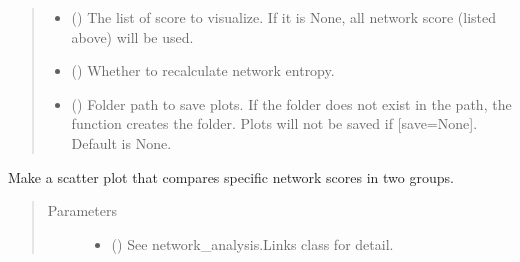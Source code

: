 \documentclass[letterpaper,10pt,english]{sphinxmanual}
\begin{document}
\begin{fulllineitems}
\begin{fulllineitems}
\begin{quote}
\begin{description}
\begin{itemize}
\item {} 
 () \textendash{} The list of score to visualize. If it is None, all network score (listed above) will be used.

\item {} 
 () \textendash{} Whether to recalculate network entropy.

\item {} 
 () \textendash{} Folder path to save plots. If the folder does not exist in the path, the function creates the folder.
Plots will not be saved if {[}save=None{]}. Default is None.

\end{itemize}

\end{description}\end{quote}

\end{fulllineitems}


\begin{fulllineitems}
\label{\detokenize{modules/celloracle:celloracle.Links.plot_score_comparison_2D}}
Make a scatter plot that compares specific network scores in two groups.
\begin{quote}\begin{description}
\item[{Parameters}] \leavevmode\begin{itemize}
\item {} 
 ({\hyperref[\detokenize{modules/celloracle:celloracle.Links}]{}}) \textendash{} See network\_analysis.Links class for detail.


\end{itemize}
\end{description}
\end{quote}
\end{fulllineitems}
\end{fulllineitems}
\end{document}
